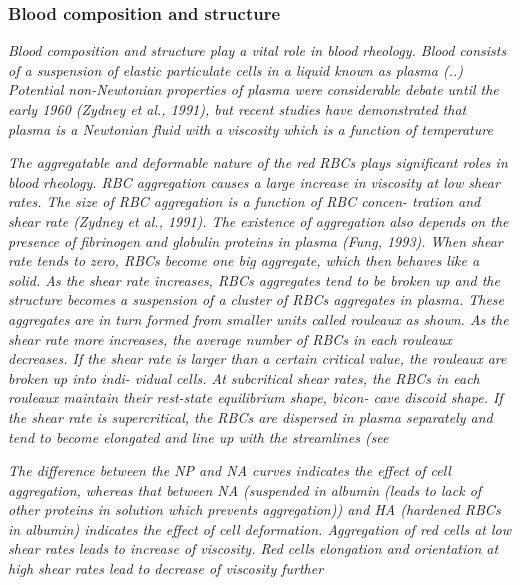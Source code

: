 \documentclass[11pt,letterpaper]{article}
\begin{document}
\subsubsection*{Blood composition and  structure}\textit{Blood composition  and structure play a vital role in blood  rheology. Blood consists of a suspension of  elastic particulate cells  in  a liquid known as plasma (..) Potential non-Newtonian properties of plasma  were considerable debate until the early 1960 (Zydney  et al., 1991), but  recent  studies have demonstrated  that plasma is  a Newtonian  fluid with  a viscosity which is a  function of temperature}

\textit{The aggregatable and  deformable nature of the red RBCs
plays significant roles in blood rheology. RBC aggregation causes a large increase in  viscosity at low shear rates. The size of RBC aggregation is a  function  of  RBC  concen- tration and shear rate (Zydney  et al., 1991).  The existence of aggregation also depends  on  the presence of fibrinogen and  globulin proteins in plasma (Fung,  1993). When  shear rate tends to  zero,  RBCs become  one big aggregate,  which then  behaves like  a solid. As  the shear  rate increases, RBCs aggregates  tend to be  broken  up and the  structure becomes a suspension of a  cluster of  RBCs aggregates in  plasma. These aggregates are  in turn formed  from smaller  units called rouleaux as shown. As the shear rate more  increases,  the average number of  RBCs  in each rouleaux  decreases. If the shear rate is larger than a certain  critical value,  the rouleaux are  broken up  into indi- vidual cells. At subcritical shear rates, the  RBCs  in each rouleaux maintain  their rest-state equilibrium  shape, bicon- cave discoid shape.  If the  shear rate is  supercritical, the RBCs  are dispersed in plasma separately  and tend to become  elongated  and line up with the streamlines  (see}

\textit{The  difference between the NP and NA curves indicates the effect of  cell aggregation, whereas that  between NA (suspended in albumin (leads to lack of other proteins in solution which prevents aggregation))  and HA (hardened RBCs in albumin) indicates the  effect of cell deformation. Aggregation of  red cells at low shear rates leads to  increase  of viscosity. Red cells  elongation and orientation  at high shear rates  lead to decrease of viscosity further}
\end{document}
